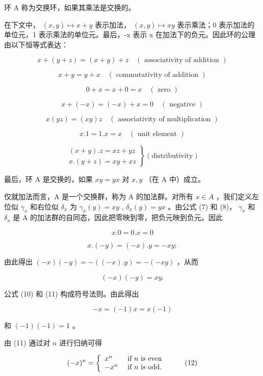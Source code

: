 环 A 称为交换环，如果其乘法是交换的。

在下文中， \((x,y)\mapsto x+y\) 表示加法， \((x,y)\mapsto xy\) 表示乘法；0 表示加法的单位元，1 表示乘法的单位元。最后，-x 表示 x 在加法下的负元。因此环的公理由以下恒等式表达：

\[
x + (y + z) = (x + y) + z \quad (\text { associativity   of   addition })\tag{1}
\]

\[
x + y = y + x \quad (\text { commutativity   of   addition })\tag{2}
\]

\[
0 + x = x + 0 = x \quad (\text { zero })\tag{3}
\]

\[
x + (- x) = (- x) + x = 0 \quad (\text { negative })\tag{4}
\]

\[
x (y z) = (x y) z \quad (\text { associativity   of   multiplication })\tag{5}
\]

\[
x. 1 = 1. x = x \quad (\text { unit   element })\tag{6}
\]

\[
\left. \begin{array}{l} (x + y). z = x z + y z \\ x. (y + z) = x y + x z \end{array} \right\} (\text {distributivity})\tag{7, 8}
\]

最后，环 A 是交换的，如果 \(xy = yx\) 对 \(x, y\) （在 A 中）成立。

仅就加法而言，A 是一个交换群，称为 A 的加法群。对所有 \(x \in A\) ，我们定义左位似 \(\gamma_{x}\) 和右位似 \(\delta_{x}\) 为 \(\gamma_{x}(y) = xy\) , \(\delta_{x}(y) = yx\) 。由公式 (7) 和 (8)， \(\gamma_{x}\) 和 \(\delta_{x}\) 是 A 的加法群的自同态，因此把零映到零，把负元映到负元。因此

\[
x. 0 = 0. x = 0\tag{9}
\]

\[
x. (- y) = (- x). y = - x y;\tag{10}
\]

由此得出 \((-x)(-y) = -((-x).y) = -(-xy)\) ，从而

\[
(- x) (- y) = x y.\tag{11}
\]

公式 (10) 和 (11) 构成符号法则。由此得出

\[
- x = (- 1) x = x (- 1)
\]

和 \((-1)(-1) = 1\) 。

由 (11) 通过对 \(n\) 进行归纳可得

\[
(- x) ^ {n} = \left\{ \begin{array}{l l} x ^ {n} & \text { if   } n \text {   is   even } \\ - x ^ {n} & \text { if   } n \text {   is   odd. } \end{array} \right.\tag{12}
\]

